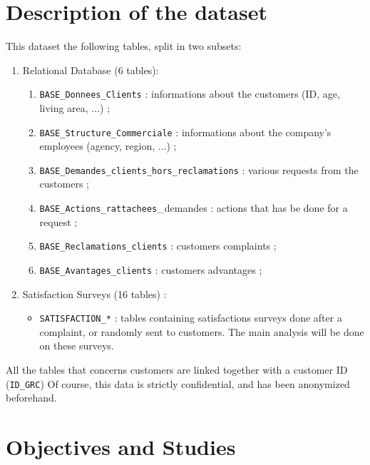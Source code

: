 \documentclass[a4paper, 11pt]{article}
\newcommand{\tw}[1]{\texttt{#1}}
\begin{document}
\section{Description of the dataset} %
	This dataset the following tables, split in two subsets:
    \begin{enumerate}
    	\item Relational Database (6 tables):
    	\begin{enumerate}
            \item \tw{BASE\_Donnees\_Clients} : informations about the customers (ID, age, living area, ...) ;
            \item \tw{BASE\_Structure\_Commerciale} : informations about the company's employees (agency, region, ...) ;
            \item \tw{BASE\_Demandes\_clients\_hors\_reclamations} : various requests from the customers ;
            \item \tw{BASE\_Actions\_rattachees}\_demandes : actions that has be done for a request ;
            \item \tw{BASE\_Reclamations\_clients} : customers complaints ;
            \item \tw{BASE\_Avantages\_clients} : customers advantages ;
        \end{enumerate}
        \item Satisfaction Surveys (16 tables) :
        \begin{itemize}
        	\item \tw{SATISFACTION\_*} : tables containing satisfactions surveys done after a complaint, or randomly sent to customers. The main analysis will be done on these surveys.
        \end{itemize}
	\end{enumerate}
    All the tables that concerns customers are linked together with a customer ID (\tw{ID\_GRC})
    Of course, this data is strictly confidential, and has been anonymized beforehand. 
    
    
    
\section{Objectives and Studies}
\end{document}
